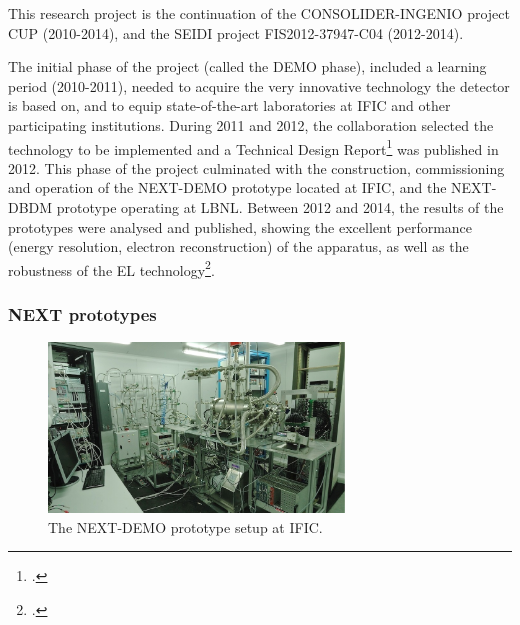 
%

This research project is the continuation of the CONSOLIDER-INGENIO project CUP (2010-2014), and the SEIDI project FIS2012-37947-C04 (2012-2014). 

The initial phase of the project (called the DEMO phase), included a learning period (2010-2011), needed to acquire the very innovative technology the detector is based on, and to equip state-of-the-art laboratories at IFIC and other participating institutions. 
During 2011 and 2012, the collaboration selected the technology to be implemented and a Technical Design Report\footcite{Alvarez:2012haa} was published in 2012. This phase of the project culminated  with the construction, commissioning and operation of the NEXT-DEMO prototype located at IFIC, and the NEXT-DBDM prototype operating at LBNL. Between 2012 and 2014, the results of the prototypes were analysed and published, showing the excellent performance (energy resolution, electron reconstruction) of the apparatus, as well as the robustness of the EL technology\footcite{Alvarez:2012hh, Alvarez:2012nd, Alvarez:2012hu,Alvarez:2013gxa,Lorca:2014sra}. 

\subsubsection*{NEXT prototypes}

\begin{figure}
\centering
\includegraphics[width=0.7\textwidth]{img/DemoSetup.jpg}
\caption{\small The NEXT-DEMO prototype setup at IFIC.} \label{fig.DEMO}
\end{figure}

